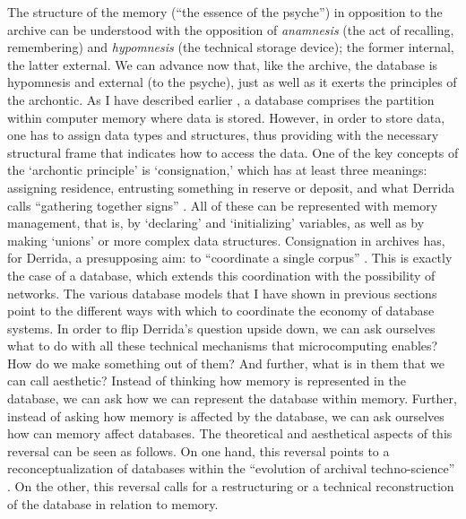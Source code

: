 The structure of the memory (``the essence of the psyche'') in opposition to the archive can be understood with the opposition of \textit{anamnesis} (the act of recalling, remembering) and \textit{hypomnesis} (the technical storage device); the former internal, the latter external. We can advance now that, like the archive, the database is hypomnesis and external (to the psyche), just as well as it exerts the principles of the archontic. As I have described earlier , a database comprises the partition within computer memory where data is stored. However, in order to store data, one has to assign data types and structures, thus providing with the necessary structural frame that indicates how to access the data. One of the key concepts of the `archontic principle' is `consignation,' which has at least three meanings: assigning residence, entrusting something in reserve or deposit, and what Derrida calls ``gathering together signs'' \parencite[10]{Der95:Arc}. All of these can be represented with memory management, that is, by `declaring' and `initializing' variables, as well as by making `unions' or more complex data structures. Consignation in archives has, for Derrida, a presupposing aim: to ``coordinate a single corpus'' \parencite[10]{Der95:Arc}. This is exactly the case of a database, which extends this coordination with the possibility of networks. The various database models that I have shown in previous sections point to the different ways with which to coordinate the economy of database systems. In order to flip Derrida's question upside down, we can ask ourselves what to do with all these technical mechanisms that microcomputing enables? How do we make something out of them? And further, what is in them that we can call aesthetic? Instead of thinking how memory is represented in the database, we can ask how we can represent the database within memory. Further, instead of asking how memory is affected by the database, we can ask ourselves how can memory affect databases. The theoretical and aesthetical aspects of this reversal can be seen as follows. On one hand, this reversal points to a reconceptualization of databases within the ``evolution of archival techno-science'' \parencite[16]{Der95:Arc}. On the other, this reversal calls for a restructuring or a technical reconstruction of the database in relation to memory. 


